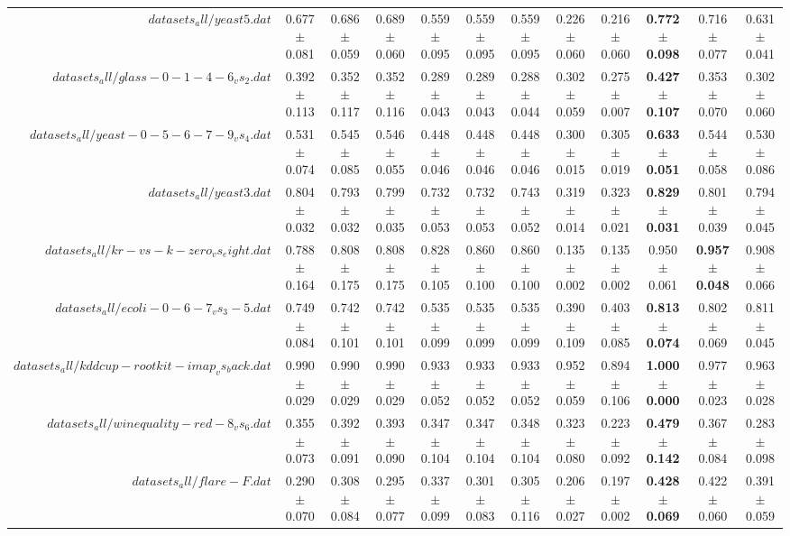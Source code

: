 \begin{table}[!ht]
{\begin{tabular}{r c c c c c c c c c c c}
$datasets_all/yeast5.dat$ & 0.677 $\pm$ 0.081 & 0.686 $\pm$ 0.059 & 0.689 $\pm$ 0.060 & 0.559 $\pm$ 0.095 & 0.559 $\pm$ 0.095 & 0.559 $\pm$ 0.095 & 0.226 $\pm$ 0.060 & 0.216 $\pm$ 0.060 & \textbf{0.772 $\pm$ 0.098} & 0.716 $\pm$ 0.077 & 0.631 $\pm$ 0.041 \\
$datasets_all/glass-0-1-4-6_vs_2.dat$ & 0.392 $\pm$ 0.113 & 0.352 $\pm$ 0.117 & 0.352 $\pm$ 0.116 & 0.289 $\pm$ 0.043 & 0.289 $\pm$ 0.043 & 0.288 $\pm$ 0.044 & 0.302 $\pm$ 0.059 & 0.275 $\pm$ 0.007 & \textbf{0.427 $\pm$ 0.107} & 0.353 $\pm$ 0.070 & 0.302 $\pm$ 0.060 \\
$datasets_all/yeast-0-5-6-7-9_vs_4.dat$ & 0.531 $\pm$ 0.074 & 0.545 $\pm$ 0.085 & 0.546 $\pm$ 0.055 & 0.448 $\pm$ 0.046 & 0.448 $\pm$ 0.046 & 0.448 $\pm$ 0.046 & 0.300 $\pm$ 0.015 & 0.305 $\pm$ 0.019 & \textbf{0.633 $\pm$ 0.051} & 0.544 $\pm$ 0.058 & 0.530 $\pm$ 0.086 \\
$datasets_all/yeast3.dat$ & 0.804 $\pm$ 0.032 & 0.793 $\pm$ 0.032 & 0.799 $\pm$ 0.035 & 0.732 $\pm$ 0.053 & 0.732 $\pm$ 0.053 & 0.743 $\pm$ 0.052 & 0.319 $\pm$ 0.014 & 0.323 $\pm$ 0.021 & \textbf{0.829 $\pm$ 0.031} & 0.801 $\pm$ 0.039 & 0.794 $\pm$ 0.045 \\
$datasets_all/kr-vs-k-zero_vs_eight.dat$ & 0.788 $\pm$ 0.164 & 0.808 $\pm$ 0.175 & 0.808 $\pm$ 0.175 & 0.828 $\pm$ 0.105 & 0.860 $\pm$ 0.100 & 0.860 $\pm$ 0.100 & 0.135 $\pm$ 0.002 & 0.135 $\pm$ 0.002 & 0.950 $\pm$ 0.061 & \textbf{0.957 $\pm$ 0.048} & 0.908 $\pm$ 0.066 \\
$datasets_all/ecoli-0-6-7_vs_3-5.dat$ & 0.749 $\pm$ 0.084 & 0.742 $\pm$ 0.101 & 0.742 $\pm$ 0.101 & 0.535 $\pm$ 0.099 & 0.535 $\pm$ 0.099 & 0.535 $\pm$ 0.099 & 0.390 $\pm$ 0.109 & 0.403 $\pm$ 0.085 & \textbf{0.813 $\pm$ 0.074} & 0.802 $\pm$ 0.069 & 0.811 $\pm$ 0.045 \\
$datasets_all/kddcup-rootkit-imap_vs_back.dat$ & 0.990 $\pm$ 0.029 & 0.990 $\pm$ 0.029 & 0.990 $\pm$ 0.029 & 0.933 $\pm$ 0.052 & 0.933 $\pm$ 0.052 & 0.933 $\pm$ 0.052 & 0.952 $\pm$ 0.059 & 0.894 $\pm$ 0.106 & \textbf{1.000 $\pm$ 0.000} & 0.977 $\pm$ 0.023 & 0.963 $\pm$ 0.028 \\
$datasets_all/winequality-red-8_vs_6.dat$ & 0.355 $\pm$ 0.073 & 0.392 $\pm$ 0.091 & 0.393 $\pm$ 0.090 & 0.347 $\pm$ 0.104 & 0.347 $\pm$ 0.104 & 0.348 $\pm$ 0.104 & 0.323 $\pm$ 0.080 & 0.223 $\pm$ 0.092 & \textbf{0.479 $\pm$ 0.142} & 0.367 $\pm$ 0.084 & 0.283 $\pm$ 0.098 \\
$datasets_all/flare-F.dat$ & 0.290 $\pm$ 0.070 & 0.308 $\pm$ 0.084 & 0.295 $\pm$ 0.077 & 0.337 $\pm$ 0.099 & 0.301 $\pm$ 0.083 & 0.305 $\pm$ 0.116 & 0.206 $\pm$ 0.027 & 0.197 $\pm$ 0.002 & \textbf{0.428 $\pm$ 0.069} & 0.422 $\pm$ 0.060 & 0.391 $\pm$ 0.059 \\

\end{tabular}}
\end{table}
